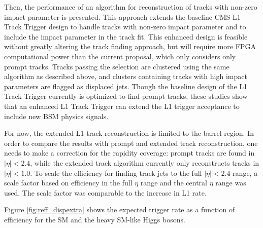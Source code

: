 Then, the performance of an algorithm for reconstruction of tracks with non-zero impact parameter is presented. This approach extends the baseline CMS L1 Track Trigger design to
handle tracks with non-zero impact parameter and to include the impact parameter in the track fit. This enhanced design is feasible without greatly altering the track finding approach, but will
require more FPGA computational power than the current proposal, which only considers only prompt tracks. Tracks passing the selection are clustered using the same algorithm as described above,
and clusters containing tracks with high impact parameters are flagged as displaced jets. Though the baseline design of the L1 Track Trigger currently is optimized to find prompt tracks, these
studies show that an enhanced L1 Track Trigger can extend the L1 trigger acceptance to include new BSM physics signals.

For now, the extended L1 track reconstruction is limited to the barrel region.
In order to compare the results with prompt and extended track reconstruction, one needs to make a correction for
the rapidity coverage: prompt tracks are found in $|\eta|<2.4$, while the extended track algorithm currently only
reconstructs tracks in $|\eta|<1.0$. To scale the efficiency for finding track jets to the full
$|\eta|<2.4$ range, a scale factor based on efficiency in the full $\eta$ range and the central $\eta$ range was used. The scale factor
was comparable to the increase in L1 rate.

Figure \ref{fig:reff_dispextra} shows the expected trigger rate as a function of efficiency for the SM and the heavy SM-like Higgs bosons.

